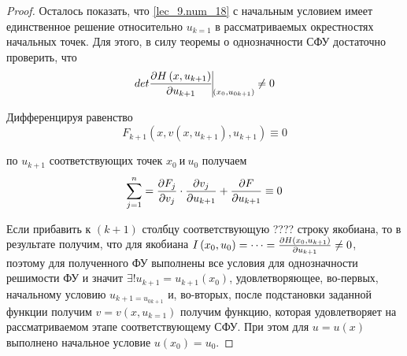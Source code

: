 \documentclass[../../main.tex]{subfiles}
\begin{document}
\begin{proof}
    Осталось показать, что \eqref{lec_9.num_18} с начальным
    условием имеет единственное решение относительно 
    $u_{k=1}$ в рассматриваемых окрестностях начальных
    точек. Для этого, в силу теоремы о однозначности СФУ
    достаточно проверить, что
    \begin{equation}
    \label{lec_9.num_20}
    det\pderiv{H\left(x, u_{k+1}\right)}{u_{k+1}} 
    \vline\underset{\left(x_0, u_{0k+1}\right)}{} \neq 0
    \end{equation}
    
    Дифференцируя равенство
    \begin{equation}
    \label{lec_9.num_21}
    F_{k+1}\left(x, v\left(x, u_{k+1}\right), 
    u_{k+1}\right) \equiv 0
    \end{equation}
    
    по $u_{k+1}$ соответствующих точек $x_0\ \text{и}\ u_0$
    получаем
    \begin{equation}
        \label{lec_9.num_22}
        \sum_{j = 1}^{n} = 
        \frac{\partial F_j}{\partial v_j} \cdot \frac{\partial v_j}{\partial u_{k+1}} + 
        \frac{\partial F}{\partial u_{k+1}} \equiv 0
    \end{equation}
    
    Если прибавить к $\left(k + 1\right)$ столбцу 
    соответствующую ???? строку якобиана, то в результате
    получим, что для якобиана
    $I\left(x_0, u_0\right)= \dots = 
    \frac{\partial H\left(x_0,u_{k+1}\right)}{\partial u_{k+1}} \neq 0$,\\
    поэтому для полученного ФУ выполнены все условия для 
    однозначности решимости ФУ и значит 
    $\exists! u_{k+1} = u_{k+1}\left(x_0\right)$, 
    удовлетворяющее, во-первых, начальному условию
    $u_{k+1 = u_{0k+1}}$ и, во-вторых, после подстановки
    заданной функции получим 
    $v = v\left(x, u_{k=1}\right)$ получим функцию,
    которая удовлетворяет на рассматриваемом этапе
    соответствующему СФУ.
    При этом для $u = u\left(x\right)$ выполнено начальное
    условие $u\left(x_0\right) = u_0$.
\end{proof}
\end{document}
